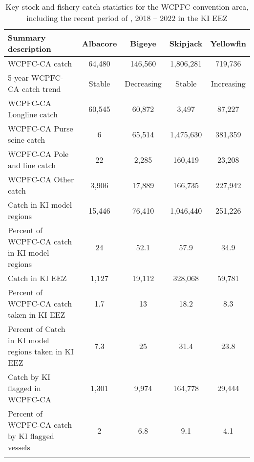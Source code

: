 \begin{longtable}{lcccc}
\caption{Key stock and fishery catch statistics for the WCPFC convention area, including the recent period of , 2018 -- 2022 in the KI EEZ} \\ 
  \hline
Summary description & Albacore & Bigeye & Skipjack & Yellowfin \\ 
  \hline
WCPFC-CA catch & 64,480 & 146,560 & 1,806,281 & 719,736 \\ 
  5-year WCPFC-CA catch trend & Stable & Decreasing & Stable & Increasing \\ 
  WCPFC-CA Longline catch & 60,545 & 60,872 & 3,497 & 87,227 \\ 
  WCPFC-CA Purse seine catch & 6 & 65,514 & 1,475,630 & 381,359 \\ 
  WCPFC-CA Pole and line catch & 22 & 2,285 & 160,419 & 23,208 \\ 
  WCPFC-CA Other catch & 3,906 & 17,889 & 166,735 & 227,942 \\ 
  Catch in KI model regions & 15,446 & 76,410 & 1,046,440 & 251,226 \\ 
  Percent of WCPFC-CA catch in KI model regions & 24 & 52.1 & 57.9 & 34.9 \\ 
   \hline
Catch in KI EEZ & 1,127 & 19,112 & 328,068 & 59,781 \\ 
  Percent of WCPFC-CA catch taken in KI EEZ & 1.7 & 13 & 18.2 & 8.3 \\ 
  Percent of Catch in KI model regions taken in KI EEZ & 7.3 & 25 & 31.4 & 23.8 \\ 
  Catch by KI flagged in WCPFC-CA & 1,301 & 9,974 & 164,778 & 29,444 \\ 
  Percent of WCPFC-CA catch by KI flagged vessels & 2 & 6.8 & 9.1 & 4.1 \\ 
  \hline
\label{cat_sum_tab}
\end{longtable}
